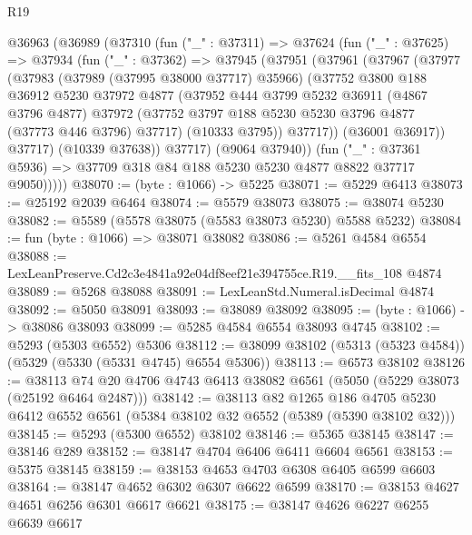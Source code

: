 \begin{lexlean}{R19}
\begin{coremodule}
  @36963
    (@36989
      (@37310
        (fun ("_" : @37311) =>
        @37624
          (fun ("_" : @37625) =>
          @37934
            (fun ("_" : @37362) =>
            @37945
              (@37951
                (@37961
                  (@37967
                    (@37977
                      (@37983
                        (@37989 (@37995 @38000 @37717) @35966)
                        (@37752
                          @3800
                          @188
                          @36912
                          @5230
                          @37972
                          @4877
                          (@37952
                            @444
                            @3799
                            @5232
                            @36911
                            (@4867 @3796 @4877)
                            @37972
                            (@37752 @3797 @188 @5230 @5230 @3796 @4877 (@37773 @446 @3796) @37717)
                            (@10333 @3795))
                          @37717))
                      (@36001 @36917))
                    @37717)
                  (@10339 @37638))
                @37717)
              (@9064 @37940))
            (fun ("_" : @37361 @5936) =>
            @37709 @318 @84 @188 @5230 @5230 @4877 @8822 @37717 @9050)))))
@38070 := (byte : @1066) -> @5225
@38071 := @5229 @6413
@38073 := @25192 @2039 @6464
@38074 := @5579 @38073
@38075 := @38074 @5230
@38082 := @5589 (@5578 @38075 (@5583 @38073 @5230) @5588 @5232)
@38084 := fun (byte : @1066) => @38071 @38082
@38086 := @5261 @4584 @6554
@38088 := LexLeanPreserve.Cd2c3e4841a92e04df8eef21e394755ce.R19.__fits_108 @4874
@38089 := @5268 @38088
@38091 := LexLeanStd.Numeral.isDecimal @4874
@38092 := @5050 @38091
@38093 := @38089 @38092
@38095 := (byte : @1066) -> @38086 @38093
@38099 := @5285 @4584 @6554 @38093 @4745
@38102 := @5293 (@5303 @6552) @5306
@38112 := @38099 @38102 (@5313 (@5323 @4584)) (@5329 (@5330 (@5331 @4745) @6554 @5306))
@38113 := @6573 @38102
@38126 := @38113 @74 @20 @4706 @4743 @6413 @38082 @6561 (@5050 (@5229 @38073 (@25192 @6464 @2487)))
@38142 := @38113
    @82
    @1265
    @186
    @4705
    @5230
    @6412
    @6552
    @6561
    (@5384 @38102 @32 @6552 (@5389 (@5390 @38102 @32)))
@38145 := @5293 (@5300 @6552) @38102
@38146 := @5365 @38145
@38147 := @38146 @289
@38152 := @38147 @4704 @6406 @6411 @6604 @6561
@38153 := @5375 @38145
@38159 := @38153 @4653 @4703 @6308 @6405 @6599 @6603
@38164 := @38147 @4652 @6302 @6307 @6622 @6599
@38170 := @38153 @4627 @4651 @6256 @6301 @6617 @6621
@38175 := @38147 @4626 @6227 @6255 @6639 @6617

\end{coremodule}
\end{lexlean}
